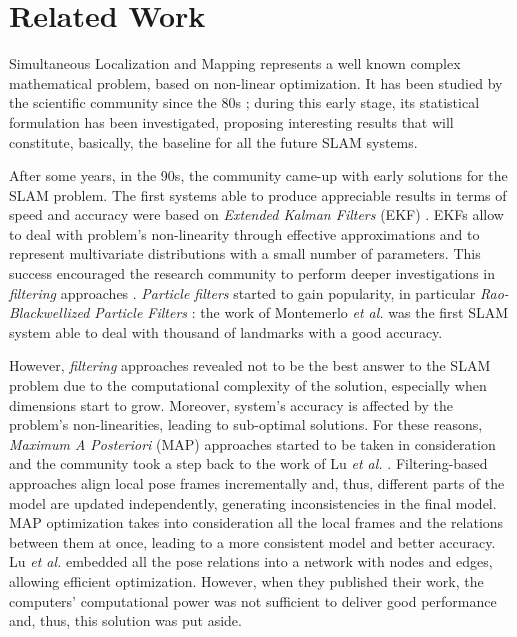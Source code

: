 \chapter{Related Work}\label{ch:related}
Simultaneous Localization and Mapping represents a well known complex mathematical problem, based on non-linear optimization. It has been studied by the scientific community since the 80s \cite{durrant2006simultaneous} \cite{bailey2006simultaneous}; during this early stage, its statistical formulation has been investigated, proposing interesting results that will constitute, basically, the baseline for all the future SLAM systems.

After some years, in the 90s, the community came-up with early solutions for the SLAM problem. The first systems able to produce appreciable results in terms of speed and accuracy were based on \textit{Extended Kalman Filters} (EKF) \cite{leonard1990dynamic} \cite{dissanayake2001solution}. EKFs allow to deal with problem's non-linearity through effective approximations and to represent multivariate distributions with a small number of parameters. This success encouraged the research community to perform deeper investigations in \textit{filtering} approaches \cite{aulinas2008filtering_review}. \textit{Particle filters} started to gain popularity, in particular \textit{Rao-Blackwellized Particle Filters} \cite{grisetti2005improving}: the work of Montemerlo \textit{et al.} \cite{montemerlo2002fastslam} was the first SLAM system able to deal with thousand of landmarks with a good accuracy. 

However, \textit{filtering} approaches revealed not to be the best answer to the SLAM problem due to the computational complexity of the solution, especially when dimensions start to grow. Moreover, system's accuracy is affected by the problem's non-linearities, leading to sub-optimal solutions. For these reasons, \textit{Maximum A Posteriori} (MAP) approaches started to be taken in consideration and the community took a step back to the work of Lu \textit{et al.} \cite{lu1997globally}. Filtering-based approaches align local pose frames incrementally and, thus, different parts of the model are updated independently, generating inconsistencies in the final model. MAP optimization takes into consideration all the local frames and the relations between them at once, leading to a more consistent model and better accuracy. Lu \textit{et al.} embedded all the pose relations into a network with nodes and edges, allowing efficient optimization. However, when they published their work, the computers' computational power was not sufficient to deliver good performance and, thus, this solution was put aside.


